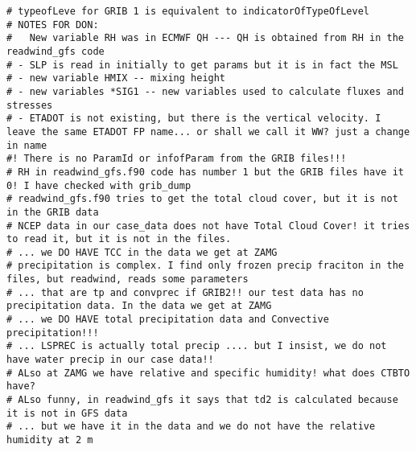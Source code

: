 \documentclass{egu}                  %
\begin{document}
\begin{landscape}
\begin{scriptsize}
\begin{verbatim}
# typeofLeve for GRIB 1 is equivalent to indicatorOfTypeOfLevel
# NOTES FOR DON:
#   New variable RH was in ECMWF QH --- QH is obtained from RH in the readwind_gfs code
# - SLP is read in initially to get params but it is in fact the MSL
# - new variable HMIX -- mixing height
# - new variables *SIG1 -- new variables used to calculate fluxes and stresses
# - ETADOT is not existing, but there is the vertical velocity. I leave the same ETADOT FP name... or shall we call it WW? just a change in name
#! There is no ParamId or infofParam from the GRIB files!!!  
# RH in readwind_gfs.f90 code has number 1 but the GRIB files have it 0! I have checked with grib_dump
# readwind_gfs.f90 tries to get the total cloud cover, but it is not in the GRIB data
# NCEP data in our case_data does not have Total Cloud Cover! it tries to read it, but it is not in the files.  
# ... we DO HAVE TCC in the data we get at ZAMG
# precipitation is complex. I find only frozen precip fraciton in the files, but readwind, reads some parameters
# ... that are tp and convprec if GRIB2!! our test data has no precipitation data. In the data we get at ZAMG
# ... we DO HAVE total precipitation data and Convective precipitation!!! 
# ... LSPREC is actually total precip .... but I insist, we do not have water precip in our case data!!
# ALso at ZAMG we have relative and specific humidity! what does CTBTO have?
# ALso funny, in readwind_gfs it says that td2 is calculated because it is not in GFS data
# ... but we have it in the data and we do not have the relative humidity at 2 m
\end{verbatim}\end{scriptsize}

\end{landscape} 
\end{document}
